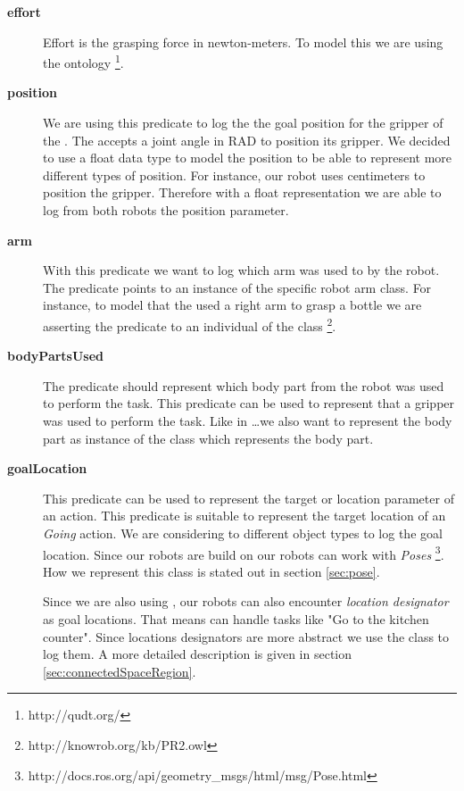 \begin{description}
	\item[\textbf{effort}] 
		Effort is the grasping force in newton-meters.
		To model this we are using the \qudt ontology \footnote{http://qudt.org/}.
	\item[\textbf{position}]
		We are using this predicate to log the the goal position for the gripper of the \pr.
		The \pr accepts a joint angle in RAD to position its gripper.
		We decided to use a float data type to model the position to be able to represent more different types of position.
		For instance, our \boxy robot uses centimeters to position the gripper.
		Therefore with a float representation we are able to log from both robots the position parameter.
	\item[\textbf{arm}]
		With this predicate we want to log which arm was used to by the robot.
		The predicate points to an instance of the specific robot arm class.
		For instance, to model that the \pr used a right arm to grasp a bottle we are asserting the  predicate to an individual of the class \footnote{http://knowrob.org/kb/PR2.owl}.
	\item[\textbf{bodyPartsUsed}]
		The  predicate should represent which body part from the robot was used to perform the task.
		This predicate can be used \eg to represent that a gripper was used to perform the task.
		Like in \dots we also want to represent the body part as instance of the class which represents the body part.
	\item[\textbf{goalLocation}]
		This predicate can be used to represent the target or location parameter of an action.
		This predicate is suitable to represent \eg the target location of an \textit{Going} action.
		We are considering to different object types to log the goal location.
		Since our robots are build on \ros our robots can work with \textit{Poses} \footnote{http://docs.ros.org/api/geometry\_msgs/html/msg/Pose.html}.
		How we represent this \owl class is stated out in section \ref{sec:pose}.
		
		Since we are also using \cram, our robots can also encounter \textit{location designator} as goal locations\cite{beetz2010cram}.
		That means \cram can handle tasks like "Go to the kitchen counter".
		Since locations designators are more abstract we use the \owl class  to log them.
		A more detailed description is given in section \ref{sec:connectedSpaceRegion}.
		

\end{description}
